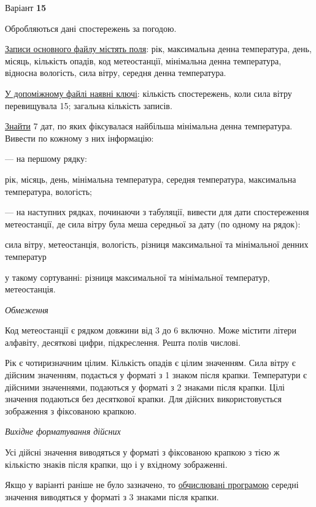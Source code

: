 \documentclass[11pt, ukrainian]{article}
\begin{document}
\par
\newpage
{\center Варіант  \No \textbf { 15 }\par}
\bigskip
Обробляються дані спостережень за погодою. 

\underline{Записи основного файлу містять поля}: рік, максимальна денна температура, день, місяць, кількість опадів, код метеостанції, мінімальна денна температура, відносна вологість, сила вітру, середня денна температура.

\underline{У допоміжному файлі наявні ключі}: кількість спостережень, коли сила вітру перевищувала 15; загальна кількість записів.

\underline{Знайти} 7 дат, по яких фіксувалася найбільша мінімальна денна температура. Вивести по кожному з них інформацію:\par
{\noindent}--- на першому рядку:\par
рік, місяць, день, мінімальна температура, середня температура, максимальна температура, вологість;

{\noindent}--- на наступних рядках, починаючи з табуляції, вивести для дати спостереження метеостанції, де сила вітру була меша середньої за дату (по одному на рядок):\par
сила вітру, метеостанція, вологість, різниця максимальної та мінімальної денних температур

{\noindent}у такому сортуванні: різниця максимальної та мінімальної температур, метеостанція.


\bigskip\textit{Обмеження}

Код метеостанції є рядком довжини від 3 до 6 включно.
Може містити літери алфавіту, десяткові цифри, підкреслення. Решта полів числові.

Рік є чотиризначним цілим.
Кількість опадів є цілим значенням.
Сила вітру є дійсним значенням, подається у форматі з 1 знаком після крапки.
Температури є дійсними значеннями, подаються у форматі з 2 знаками після крапки.
Цілі значення подаються без десяткової крапки.
Для дійсних використовується зображення з фіксованою крапкою.

\textit{Вихідне форматування дійсних}

Усі дійсні значення виводяться у форматі з фіксованою крапкою з тією ж кількістю знаків після крапки, що і у вхідному зображенні.

Якщо у варіанті раніше не було зазначено, то \underline{обчислювані програмою} середні значення виводяться у форматі з 3 знаками після крапки.
\end{document}
